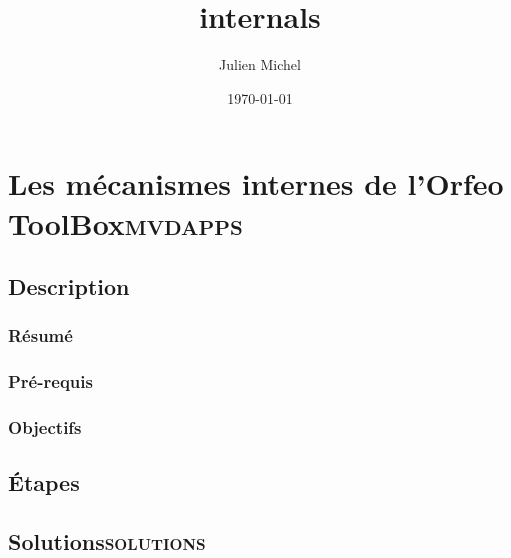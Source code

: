 \documentclass[11pt]{article}
\author{Julien Michel}
\date{\today}
\title{internals}
\begin{document}
\maketitle
\tableofcontents

\section{Les mécanismes internes de l'\textbf{Orfeo ToolBox}\hfill{}\textsc{mvdapps}}
\label{sec-1}
\subsection{Description}
\label{sec-1-1}
\subsubsection{Résumé}
\label{sec-1-1-1}

\subsubsection{Pré-requis}
\label{sec-1-1-2}


\subsubsection{Objectifs}
\label{sec-1-1-3}

\subsection{Étapes}
\label{sec-1-2}

\subsection{Solutions\hfill{}\textsc{solutions}}
\label{sec-1-3}
\end{document}
